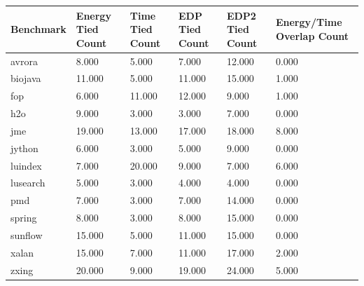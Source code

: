 \begin{tabular}{llllll}
\hline
Benchmark & Energy Tied Count & Time Tied Count & EDP Tied Count & EDP2 Tied Count & Energy/Time Overlap Count \\
\hline
avrora & 8.000 & 5.000 & 7.000 & 12.000 & 0.000 \\
biojava & 11.000 & 5.000 & 11.000 & 15.000 & 1.000 \\
fop & 6.000 & 11.000 & 12.000 & 9.000 & 1.000 \\
h2o & 9.000 & 3.000 & 3.000 & 7.000 & 0.000 \\
jme & 19.000 & 13.000 & 17.000 & 18.000 & 8.000 \\
jython & 6.000 & 3.000 & 5.000 & 9.000 & 0.000 \\
luindex & 7.000 & 20.000 & 9.000 & 7.000 & 6.000 \\
lusearch & 5.000 & 3.000 & 4.000 & 4.000 & 0.000 \\
pmd & 7.000 & 3.000 & 7.000 & 14.000 & 0.000 \\
spring & 8.000 & 3.000 & 8.000 & 15.000 & 0.000 \\
sunflow & 15.000 & 5.000 & 11.000 & 15.000 & 0.000 \\
xalan & 15.000 & 7.000 & 11.000 & 17.000 & 2.000 \\
zxing & 20.000 & 9.000 & 19.000 & 24.000 & 5.000 \\
\hline
\end{tabular}
